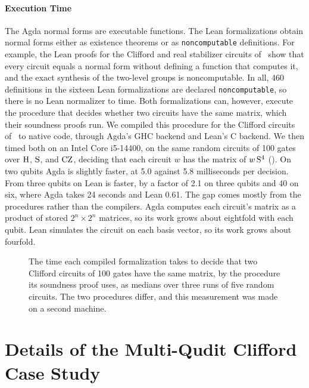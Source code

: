 \documentclass[acmsmall,screen,nonacm]{acmart}
\begin{document}
\paragraph{Execution Time} The Agda normal forms are executable functions. The Lean formalizations obtain normal forms either as existence theorems or as \texttt{noncomputable} definitions. For example, the Lean proofs for the Clifford and real stabilizer circuits of~\cite{selinger2015clifford,makary2021real} show that every circuit equals a normal form without defining a function that computes it, and the exact synthesis of the two-level groups is noncomputable. In all, 460 definitions in the sixteen Lean formalizations are declared \texttt{noncomputable}, so there is no Lean normalizer to time. Both formalizations can, however, execute the procedure that decides whether two circuits have the same matrix, which their soundness proofs run. We compiled this procedure for the Clifford circuits of~\cite{selinger2015clifford} to native code, through Agda's GHC backend and Lean's C backend. We then timed both on an Intel Core i5-14400, on the same random circuits of 100 gates over $\mathrm{H}$, $\mathrm{S}$, and $\mathrm{CZ}$, deciding that each circuit $w$ has the matrix of $w\,\mathrm{S}^4$ (). On two qubits Agda is slightly faster, at 5.0 against 5.8 milliseconds per decision. From three qubits on Lean is faster, by a factor of 2.1 on three qubits and 40 on six, where Agda takes 24 seconds and Lean 0.61. The gap comes mostly from the procedures rather than the compilers. Agda computes each circuit's matrix as a product of stored $2^n\times 2^n$ matrices, so its work grows about eightfold with each qubit. Lean simulates the circuit on each basis vector, so its work grows about fourfold.

\begin{figure}[!htbp]
\centering

\caption{The time each compiled formalization takes to decide that two Clifford circuits of 100 gates have the same matrix, by the procedure its soundness proof uses, as medians over three runs of five random circuits. The two procedures differ, and this measurement was made on a second machine.}
\label{fig:compare-exec}
\end{figure}

\fi


\iffalse
\section{Details of the Multi-Qudit Clifford Case Study}\label{app:qupit-details}
\end{document}
